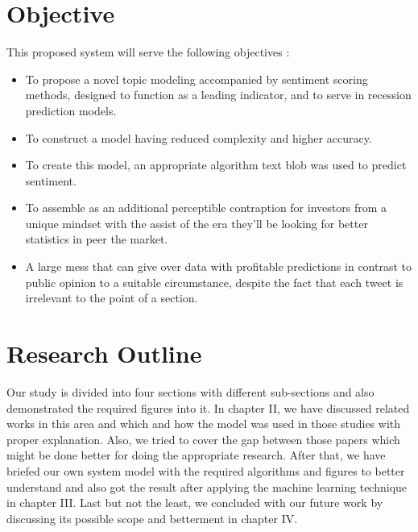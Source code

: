 \section{Objective} 
This proposed system will serve the following objectives :
\begin{itemize}
    \item To propose a novel topic modeling accompanied by sentiment scoring methods, designed to function as a leading indicator, and to serve in recession prediction models.
    \item To construct a model having reduced complexity and higher accuracy.
    \item To create this model, an appropriate algorithm text blob was used to predict sentiment.
    \item To assemble as an additional perceptible contraption for investors from a unique mindset with the assist of the era they’ll be looking for better statistics in peer the market.
    \item A large mess that can give over data with profitable predictions in contrast to public opinion to a suitable circumstance, despite the fact that each tweet is irrelevant to the point of a section.

\end{itemize}


\section{Research Outline}
Our study is divided into four sections with different sub-sections and also demonstrated the required figures into it. In chapter II, we have discussed related works in this area and which and how the model was used in those studies with proper explanation. Also, we tried to cover the gap between those papers which might be done better for doing the appropriate research. After that, we have briefed our own system model with the required algorithms and figures to better understand and also got the result after applying the machine learning technique in chapter III. Last but not the least, we concluded with our future work by discussing its possible scope and betterment in chapter IV.\\
